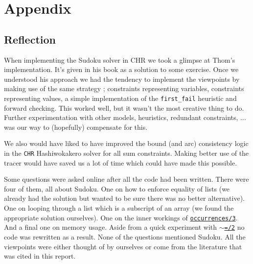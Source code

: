 \section*{Appendix}
\label{sec:appendix}

\subsection*{Reflection}\label{sec:reflection}

When implementing the Sudoku solver in CHR we took a glimpse at Thom's implementation. It's given in his book as a solution to some exercise. Once we understood his approach we had the tendency to implement the viewpoints by making use of the same strategy ; constraints representing variables, constraints representing values, a simple implementation of the \texttt{first\_fail} heuristic and forward checking. This worked well, but it wasn't the most creative thing to do. Further experimentation with other models, heuristics, redundant constraints, ... was our way to (hopefully) compensate for this.\\\par

We also would have liked to have improved the bound (and arc) consistency logic in the \texttt{CHR} Hashiwokakero solver for all sum constraints. Making better use of the tracer would have saved us a lot of time which could have made this possible.\\\par

Some questions were asked online after all the code had been written. There were four of them, all about Sudoku. One on how to enforce equality of lists (we already had the solution but wanted to be sure there was no better alternative). One on looping through a list which is a subscript of an array (we found the appropriate solution ourselves). One on the inner workings of \href{http://eclipseclp.org/doc/bips/lib/ic_global/occurrences-3.html}{\texttt{occurrences/3}}. And a final one on memory usage. Aside from a quick experiment with \href{https://eclipseclp.org/doc/bips/kernel/termcomp/TE-2.html}{\texttt{$\sim$=/2}} no code was rewritten as a result. None of the questions mentioned Sudoku. All the viewpoints were either thought of by ourselves or come from the literature that was cited in this report.


